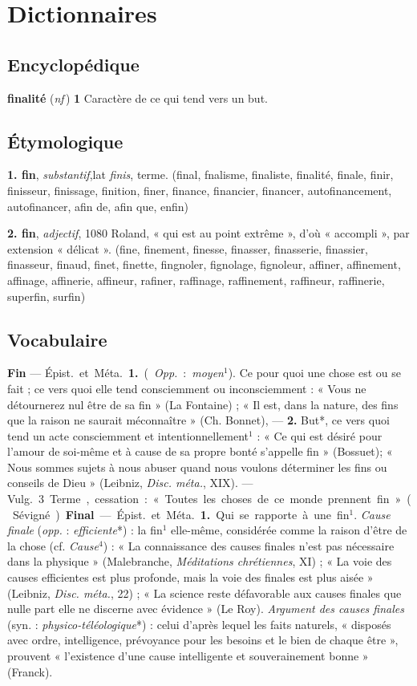 
\section{Dictionnaires}
\subsection{Encyclopédique}
{\bf finalité} ({\it nf}\,) {\bf 1} Caractère de ce qui tend vers un but.

\subsection{Étymologique}
{\bf 1. fin}, {\it substantif},lat {\it finis}, terme.
{\footnotesize (final, fnalisme, finaliste, finalité, finale, finir, finisseur, finissage, finition, finer, finance, financier, financer, autofinancement, autofinancer, afin de, afin que, enfin)}

{\bf 2. fin}, {\it adjectif}, 1080 Roland,  « qui est au point extrême », d'où « accompli », par extension « délicat ».
{\footnotesize (fine, finement, finesse, finasser, finasserie, finassier, finasseur, finaud, finet, finette, fingnoler, fignolage, fignoleur, affiner, affinement, affinage, affinerie, affineur, rafiner, raffinage, raffinement, raffineur, raffinerie, superfin, surfin)}


\subsection{Vocabulaire}

{\bf Fin} — \si{Épist.} et \si{Méta.} {\bf 1.} ({\it Opp.} : {\it moyen}$^1$).
Ce pour quoi une chose est ou se fait ; ce vers quoi elle tend consciemment
ou inconsciemment : « Vous ne détournerez nul être de sa fin » (La
Fontaine) ; « Il est, dans la nature, des fins que la raison ne saurait
méconnaître » (Ch. Bonnet), — {\bf 2.} But*, ce vers quoi tend un
acte consciemment et intentionnellement$^1$ : « Ce qui est désiré pour
l'amour de soi-même et à cause de
sa propre bonté s’appelle fin » (Bossuet); « Nous sommes sujets à nous
abuser quand nous voulons déterminer les fins ou conseils de Dieu »
(Leibniz, {\it Disc. méta.}, XIX). — \si{Vulg.} 3 Terme, cessation :
« Toutes les choses de ce monde prennent fin » (Sévigné).

{\bf Final} — \si{Épist.} et \si{Méta.} {\bf 1.} Qui se rapporte à une fin$^1$.
{\it Cause finale} ({\it opp.} : {\it efficiente}*) : la fin$^1$ elle-même,
considérée comme la raison d’être de la chose (cf. {\it Cause}$^4$) : « La
connaissance des causes finales n’est pas nécessaire dans la physique »
(Malebranche, {\it Méditations chrétiennes}, XI) ; « La voie des causes
efficientes est plus profonde, mais la voie des finales est plus aisée »
(Leibniz, {\it Disc. méta.}, 22) ; « La science reste défavorable aux causes
finales que nulle part elle ne discerne avec évidence » (Le Roy).
{\it Argument des causes finales} (syn. : {\it physico-téléologique}*) :
celui d’après lequel les faits naturels, « disposés avec ordre, intelligence,
prévoyance pour les besoins et le bien de chaque être », prouvent
« l'existence d’une cause intelligente et souverainement bonne » (Franck).

